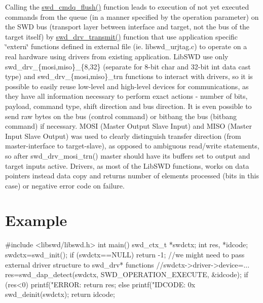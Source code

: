 Calling the \hyperlink{libswd_8c_ad53379f5a7756cc91b01e867aaaa489d}{swd\_\-cmdq\_\-flush()} function leads to execution of not yet executed commands from the queue (in a manner specified by the operation parameter) on the SWD bus (transport layer between interface and target, not the bus of the target itself) by \hyperlink{libswd_8c_a2891df407bc8178e3ca45bd508822327}{swd\_\-drv\_\-transmit()} function that use application specific \char`\"{}extern\char`\"{} functions defined in external file (ie. libswd\_\-urjtag.c) to operate on a real hardware using drivers from existing application. LibSWD use only swd\_\-drv\_\-\{mosi,miso\}\_\-\{8,32\} (separate for 8-\/bit char and 32-\/bit int data cast type) and swd\_\-drv\_\-\{mosi,miso\}\_\-trn functions to interact with drivers, so it is possible to easily reuse low-\/level and high-\/level devices for communications, as they have all information necessary to perform exact actions -\/ number of bits, payload, command type, shift direction and bus direction. It is even possible to send raw bytes on the bus (control command) or bitbang the bus (bitbang command) if necessary. MOSI (Master Output Slave Input) and MISO (Master Input Slave Output) was used to clearly distinguish transfer direction (from master-\/interface to target-\/slave), as opposed to ambiguous read/write statements, so after swd\_\-drv\_\-mosi\_\-trn() master should have its buffers set to output and target inputs active. Drivers, as most of the LibSWD functions, works on data pointers instead data copy and returns number of elements processed (bits in this case) or negative error code on failure.\hypertarget{index_doc_example}{}\section{Example}\label{index_doc_example}

\begin{DoxyCode}
  #include <libswd/libswd.h>
  int main(){
   swd_ctx_t *swdctx;
   int res, *idcode;
   swdctx=swd_init();
   if (swdctx==NULL) return -1;
   //we might need to pass external driver structure to swd_drv* functions 
   //swdctx->driver->device=...
   res=swd_dap_detect(swdctx, SWD_OPERATION_EXECUTE, &idcode);
   if (res<0){
    printf("ERROR: %
    return res;
   } else printf("IDCODE: 0x%
   swd_deinit(swdctx);
   return idcode;
  }
\end{DoxyCode}
 